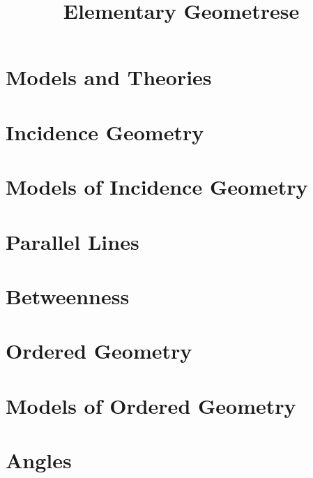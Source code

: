 \documentclass{memoir}
\begin{document}
\title{Elementary Geometrese}


\frontmatter
  \maketitle

  \tableofcontents


\mainmatter
  \section{Models and Theories}
    
    \newpage

  \section{Incidence Geometry}
    
    \newpage

  \section{Models of Incidence Geometry}
    
    \newpage

  \section{Parallel Lines}
    
    \newpage

  \section{Betweenness}
    
    \newpage

  \section{Ordered Geometry}
    
    \newpage

  \section{Models of Ordered Geometry}
    
    \newpage

  \section{Angles}
    
    \newpage
\end{document}
